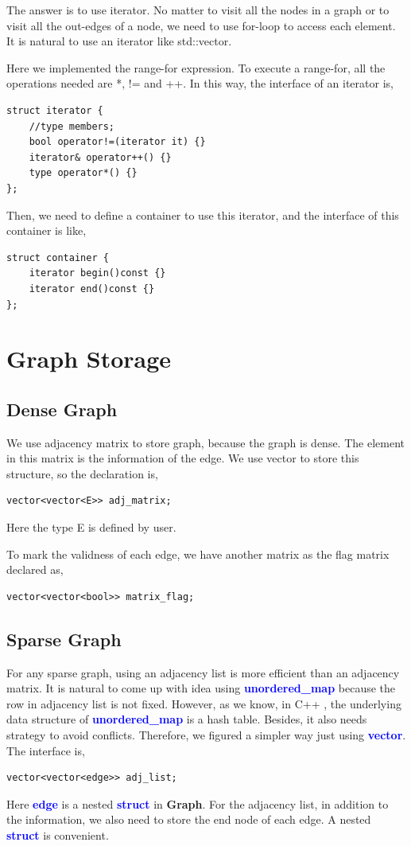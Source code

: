 \documentclass[]{article}
\begin{document}
The answer is to use iterator. No matter to visit all the nodes in a graph or to visit all the out-edges of a node, we need to use for-loop to access each element. It is natural to use an iterator like std::vector. 

Here we implemented the range-for expression. To execute a range-for, all the operations needed are *, != and ++.  In this way, the interface of an iterator is,
\begin{lstlisting}
struct iterator {
	//type members;
	bool operator!=(iterator it) {}
	iterator& operator++() {}
	type operator*() {}
};
\end{lstlisting}
Then, we need to define a container to use this iterator, and the interface of this container is like,
\begin{lstlisting}
struct container {
	iterator begin()const {}
	iterator end()const {}
};
\end{lstlisting}
\section{Graph Storage}
\subsection{Dense Graph}
We use adjacency matrix to store graph, because the graph is dense. The element in this matrix is the information of the edge. We use vector to store this structure, so the declaration is,

\begin{lstlisting}
vector<vector<E>> adj_matrix;

\end{lstlisting} 
Here the type E is defined by user. 

To mark the validness of each edge, we have another matrix as the flag matrix declared as,
\begin{lstlisting}
vector<vector<bool>> matrix_flag;
\end{lstlisting}



\subsection{Sparse Graph}
For any sparse graph, using an adjacency list is more efficient than an adjacency matrix. It is natural to come up with idea using \textbf{\textcolor{blue}{unordered\_map}} because the row in adjacency list is not fixed. However, as we know, in C++ , the underlying data structure of \textbf{\textcolor{blue}{unordered\_map}} is a hash table. Besides, it also needs strategy to avoid conflicts. Therefore, we figured a simpler way just using \textbf{\textcolor{blue}{vector}}. The interface is,
\begin{lstlisting}
vector<vector<edge>> adj_list;

\end{lstlisting} 
Here \textbf{\textcolor{blue}{edge}} is a nested \textbf{\textcolor{blue}{struct}} in \textbf{Graph}. For the adjacency list, in addition to the information, we also need to store the end node of each edge. A nested \textbf{\textcolor{blue}{struct}} is convenient.
\end{document}
